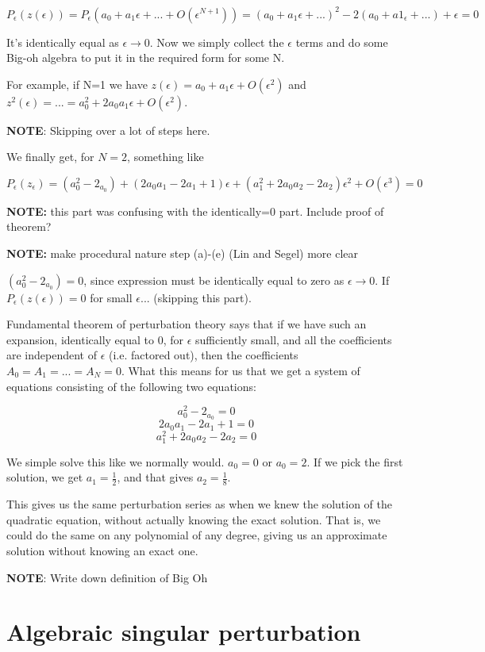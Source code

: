 \documentclass[12pt]{report}
\begin{document}
$$P_\epsilon(z(\epsilon)) = P_\epsilon(a_0 + a_1\epsilon + ... +
O(\epsilon^{N+1})) = (a_0 + a_1\epsilon + ...)^2 - 2(a_0 + a1_\epsilon
+ ...) + \epsilon = 0$$

It's identically equal as $\epsilon \to 0$. Now we simply collect the
$\epsilon$ terms and do some Big-oh algebra to put it in the required
form for some N.

For example, if N=1 we have $z(\epsilon) = a_0 + a_1\epsilon +
O(\epsilon^2)$ and $z^2(\epsilon) = ... = a_0^2 + 2 a_0 a_1 \epsilon +
O(\epsilon^2)$.

\textbf{NOTE}: Skipping over a lot of steps here.

We finally get, for $N=2$, something like

$$P_\epsilon(z_\epsilon) = (a_0^2 - 2_{a_0}) + (2 a_0 a_1 - 2 a_1 +1)\epsilon + (a_1^2 + 2 a_0 a_2 -
2 a_2)\epsilon^2 + O(\epsilon^3) = 0$$

\textbf{NOTE:} this part was confusing with the identically=0 part. Include proof of theorem?

\textbf{NOTE:} make procedural nature step (a)-(e) (Lin and Segel) more clear

$(a_0^2 - 2_{a_0}) = 0$, since expression must be identically equal to zero as
$\epsilon \to 0$. If $P_\epsilon(z(\epsilon)) = 0$ for small $\epsilon$... (skipping this part).

Fundamental theorem of perturbation theory says that if we have such an
expansion, identically equal to 0, for $\epsilon$ sufficiently small, and all
the coefficients are independent of $\epsilon$ (i.e. factored out), then the
coefficients $A_0 = A_1 = ... = A_N = 0$. What this means for us that we get a
system of equations consisting of the following two equations:

$$ a_0^2 - 2_{a_0} = 0$$
$$ 2 a_0 a_1 - 2 a_1 +1 = 0 $$
$$ a_1^2 + 2 a_0 a_2 -2 a_2 = 0$$

We simple solve this like we normally would. $a_0 = 0$ or $a_0 = 2$. If
we pick the first solution, we get $a_1=\frac 1 2$, and that gives
$a_2 = \frac 1 8$.

This gives us the same perturbation series as when we knew the
solution of the quadratic equation, without actually knowing the exact
solution. That is, we could do the same on any polynomial of any
degree, giving us an approximate solution without knowing an exact
one.

\textbf{NOTE}: Write down definition of Big Oh

\chapter{Algebraic singular perturbation}
\end{document}
